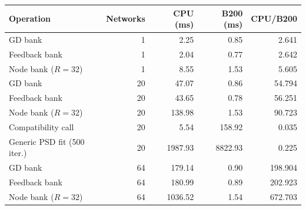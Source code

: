 \begin{tabular}{lr rrr}
\hline
Operation & Networks & CPU (ms) & B200 (ms) & CPU/B200 \\
\hline
GD bank & 1 & 2.25 & 0.85 & 2.641 \\
Feedback bank & 1 & 2.04 & 0.77 & 2.642 \\
Node bank ($R=32$) & 1 & 8.55 & 1.53 & 5.605 \\
GD bank & 20 & 47.07 & 0.86 & 54.794 \\
Feedback bank & 20 & 43.65 & 0.78 & 56.251 \\
Node bank ($R=32$) & 20 & 138.98 & 1.53 & 90.723 \\
Compatibility call & 20 & 5.54 & 158.92 & 0.035 \\
Generic PSD fit (500 iter.) & 20 & 1987.93 & 8822.93 & 0.225 \\
GD bank & 64 & 179.14 & 0.90 & 198.904 \\
Feedback bank & 64 & 180.99 & 0.89 & 202.923 \\
Node bank ($R=32$) & 64 & 1036.52 & 1.54 & 672.703 \\
\hline
\end{tabular}
